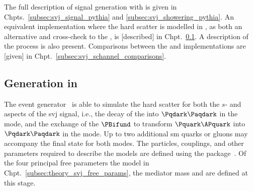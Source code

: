 The full description of \schannel signal generation with \PYTHIAEIGHT is given in Chpts.~\ref{subsec:svj_signal_pythia} and \ref{subsec:svj_showering_pythia}. An equivalent implementation where the hard scatter is modelled in \MGvATNLO, as both an alternative and cross-check to the \PYTHIA [version], is [described] in Chpt.~\ref{subsec:svj_signal_madgraph}. A description of the \tchannel process is also present. Comparisons between the \PYTHIA and \MADGRAPH implementations are [given] in Chpt.~\ref{subsec:svj_schannel_comparisons}.






\subsection{Generation in \texorpdfstring{\MADGRAPH}{MadGraph}}
\label{subsec:svj_signal_madgraph}

The \MADGRAPHFULL event generator~\cite{Alwall:2011madgraph} is able to simulate the hard scatter for both the $s$- and \tchannel aspects of the \gls{svj} signal, i.e., the decay of the \PZprime into $\Pqdark\Paqdark$ in the \schannel mode, and the exchange of the $\PBifund$ to transform $\Pquark\APquark$ into $\Pqdark\Paqdark$ in the \tchannel mode. Up to two additional \acrlong{sm} quarks or gluons may accompany the final state for both modes. The particles, couplings, and other parameters required to describe the models are defined using the \FEYNRULES package~\cite{Alloul:2013bka}. Of the four principal free parameters the model in Chpt.~\ref{subsec:theory_svj_free_params}, the mediator mass and \mqdark are defined at this stage.

